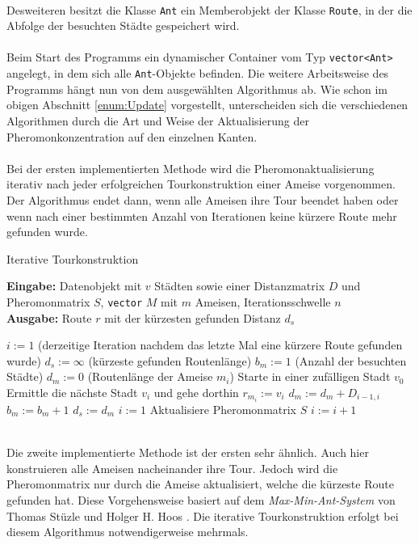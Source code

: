 \documentclass[doktyp=barbeit, sprache=german]{TUBAFarbeiten}
\begin{document}
\\Desweiteren besitzt die Klasse \texttt{Ant} ein Memberobjekt der Klasse \texttt{Route}, in der die Abfolge der besuchten Städte gespeichert wird. 
\\\\Beim Start des Programms ein dynamischer Container vom Typ \texttt{vector<Ant>} angelegt, in dem sich alle \texttt{Ant}-Objekte befinden. Die weitere Arbeitsweise des Programms hängt nun von dem ausgewählten Algorithmus ab. Wie schon im obigen Abschnitt \ref{enum:Update} vorgestellt, unterscheiden sich die verschiedenen Algorithmen durch die Art und Weise der Aktualisierung der Pheromonkonzentration auf den einzelnen Kanten.
\\\\Bei der ersten implementierten Methode wird die Pheromonaktualisierung iterativ nach jeder erfolgreichen Tourkonstruktion einer Ameise vorgenommen. Der Algorithmus endet dann, wenn alle Ameisen ihre Tour beendet haben oder wenn nach einer bestimmten Anzahl von Iterationen keine kürzere Route mehr gefunden wurde.
\begin{algorithm}
\caption{Iterative Tourkonstruktion}
\label{IterativeTour}
\textbf{Eingabe:} Datenobjekt mit $v$ Städten sowie einer Distanzmatrix $D$ und Pheromonmatrix $S$, \texttt{vector} $M$ mit $m$ Ameisen, Iterationsschwelle $n$
\\\textbf{Ausgabe:} Route $r$ mit der kürzesten gefunden Distanz $d_s$
\begin{algorithmic}[1]
\State $i := 1$ (derzeitige Iteration nachdem das letzte Mal eine kürzere Route gefunden wurde)
\State $d_s := \infty$ (kürzeste gefunden Routenlänge)
\State $b_m := 1$ (Anzahl der besuchten Städte)
\State $d_m := 0$ (Routenlänge der Ameise $m_i$)
\State Starte in einer zufälligen Stadt $v_0$
\State Ermittle die nächste Stadt $v_i$ und gehe dorthin
\State $r_{m_i} := v_i$
\State $d_m := d_m + D_{i-1,i}$
\State $b_m := b_m + 1$
\EndWhile
{}
\State $d_s := d_m$
\State $i := 1$
\EndIf
\State Aktualisiere Pheromonmatrix $S$
\State $i := i + 1$
\EndIf
\EndFor
\end{algorithmic}
\end{algorithm}
\\Die zweite implementierte Methode ist der ersten sehr ähnlich. Auch hier konstruieren alle Ameisen nacheinander ihre Tour. Jedoch wird die Pheromonmatrix nur durch die Ameise aktualisiert, welche die kürzeste Route gefunden hat. Diese Vorgehensweise basiert auf dem \textit{Max-Min-Ant-System} von Thomas Stüzle und Holger H. Hoos \cite{MaxMin}. Die iterative Tourkonstruktion erfolgt bei diesem Algorithmus notwendigerweise mehrmals. 
\end{document}
